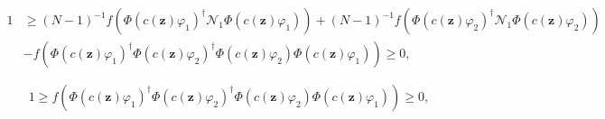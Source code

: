 \documentclass[aps,preprint]{revtex4}%
\begin{document}
\begin{align}
1  &  \geq\left(  N-1\right)  ^{-1}f\left(  \Phi\left(  c\left(
\mathbf{z}\right)  \varphi_{1}\right)  ^{\dagger}\mathcal{N}_{1}\Phi\left(
c\left(  \mathbf{z}\right)  \varphi_{1}\right)  \right)  +\left(  N-1\right)
^{-1}f\left(  \Phi\left(  c\left(  \mathbf{z}\right)  \varphi_{2}\right)
^{\dagger}\mathcal{N}_{1}\Phi\left(  c\left(  \mathbf{z}\right)  \varphi
_{2}\right)  \right) \nonumber\\
&  \left.  -\right.  f\left(  \Phi\left(  c\left(  \mathbf{z}\right)
\varphi_{1}\right)  ^{\dagger}\Phi\left(  c\left(  \mathbf{z}\right)
\varphi_{2}\right)  ^{\dagger}\Phi\left(  c\left(  \mathbf{z}\right)
\varphi_{2}\right)  \Phi\left(  c\left(  \mathbf{z}\right)  \varphi
_{1}\right)  \right)  \geq0,
\end{align}
%

\begin{equation}
1\geq f\left(  \Phi\left(  c\left(  \mathbf{z}\right)  \varphi_{1}\right)
^{\dagger}\Phi\left(  c\left(  \mathbf{z}\right)  \varphi_{2}\right)
^{\dagger}\Phi\left(  c\left(  \mathbf{z}\right)  \varphi_{2}\right)
\Phi\left(  c\left(  \mathbf{z}\right)  \varphi_{1}\right)  \right)  \geq0,
\end{equation}
\bigskip
\end{document}
